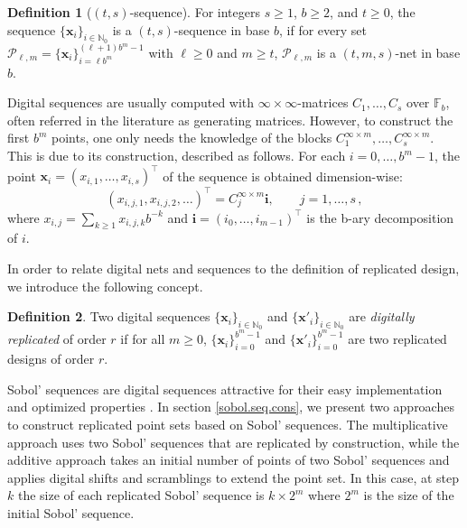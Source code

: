 \documentclass[]{elsarticle}
\theoremstyle{definition}
\newtheorem{defin}{Definition}
\newcommand{\bvec}[1]{\boldsymbol{#1}}
\newcommand{\vx}{\bvec{x}}
\newcommand{\vi}{\bvec{i}}
\begin{document}
\begin{defin}[$(t,s)$-sequence]
For integers $s\geq 1$, $b\geq 2$, and $t\geq 0$, the sequence $\{\vx_i\}_{i\in\mathbb{N}_0}$ is a $(t,s)$-sequence in base $b$, if for every set $\mathcal{P}_{\ell,m}=\{\vx_i\}_{i=\ell b^m}^{(\ell+1)b^m-1}$ with $\ell\geq 0$ and $m\geq t$, $\mathcal{P}_{\ell,m}$ is a $(t,m,s)$-net in base $b$.
\end{defin}

Digital sequences are usually computed with $\infty\times\infty$-matrices $C_1,\dots,C_s$ over $\mathbb{F}_b$, often referred in the literature as generating matrices. However, to construct the first $b^m$ points, one only needs the knowledge of the blocks $C_1^{\infty\times m},\dots,C_s^{\infty\times m}$. This is due to its construction, described as follows. For each $i=0,\dots,b^m-1$, the point $\vx_i = (x_{i,1},\dots,x_{i,s})^\intercal$ of the sequence is obtained dimension-wise:
\begin{equation}
\label{dig.net.eq.}
(x_{i,j,1},x_{i,j,2},\dots)^\intercal = C_j^{\infty\times m} \vi,\qquad j= 1,\dots,s\, ,
\end{equation}
where $x_{i,j} = \sum_{k \geq 1}x_{i,j,k}b^{-k}$ and $\vi = (i_{0},\dots,i_{m-1})^\intercal$ is the b-ary decomposition of $i$.

In order to relate digital nets and sequences to the definition of replicated design, we introduce the following concept.
\begin{defin}
Two digital sequences $\{\vx_i\}_{i\in\mathbb{N}_0}$ and $\{{\vx'}_i\}_{i\in\mathbb{N}_0}$ are \emph{digitally replicated} of order $r$ if for all $m\geq 0$, $\{{\vx}_i\}_{i=0}^{b^m-1}$ and $\{{\vx'}_i\}_{i=0}^{b^m-1}$ are two replicated designs of order $r$.
\end{defin}
 
\bigskip

Sobol' sequences are digital sequences attractive for their easy implementation and optimized properties \cite{kuo2}. %
In section \ref{sobol.seq.cons}, we present two approaches to construct replicated point sets based on Sobol' sequences. The multiplicative approach uses two Sobol' sequences that are replicated by construction, while the additive approach takes an initial number of points of two Sobol' sequences and applies digital shifts and scramblings to extend the point set. In this case, at step $k$ the size of each replicated Sobol' sequence is $ k \times 2^m$ where $2^m$ is the size of the initial Sobol' sequence. 
\end{document}
